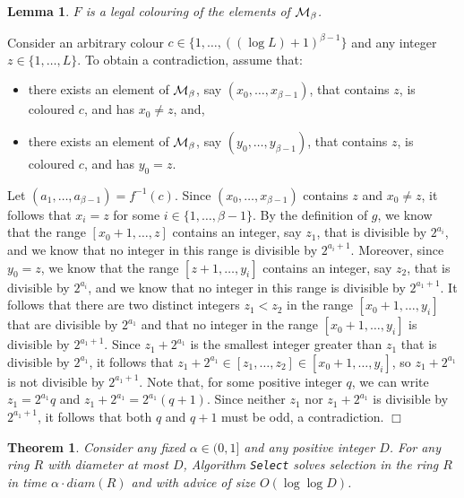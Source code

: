 \documentclass[11pt]{article}
\newtheorem{theorem}{Theorem}[section]
\newtheorem{lemma}{Lemma}[section]
\newcommand{\qed}{\hfill $\Box$ \bigbreak}
\newenvironment{proof}{\noindent {\bf Proof.}}{\qed}
\newcommand{\diam}[1]{\ensuremath{{diam}(#1)}}
\newcommand{\maxcandidates}{\ensuremath{\beta}}
\begin{document}
\begin{lemma}\label{isLegal}
$F$ is a legal colouring of the elements of ${\cal M}_{\maxcandidates}$.
\end{lemma}
\begin{proof}
Consider an arbitrary colour $c \in \{1,\dots, ((\log L)+1)^{\maxcandidates-1}\}$ and any integer $z \in \{1,\ldots,L\}$. To obtain a contradiction, assume that: 
\begin{itemize}
\item there exists an element of ${\cal M}_{\maxcandidates}$, say $(x_0,\ldots,x_{\maxcandidates-1})$, that contains $z$, is coloured $c$, and has $x_0 \neq z$, and,
\item there exists an element of ${\cal M}_{\maxcandidates}$, say $(y_0,\ldots,y_{\maxcandidates-1})$, that contains $z$, is coloured $c$, and has $y_0 = z$.
\end{itemize}
Let $(a_1,\ldots,a_{\maxcandidates-1})=f^{-1}(c)$.
Since $(x_0,\ldots,x_{\maxcandidates-1})$ contains $z$ and $x_0 \neq z$, it follows that $x_i = z$ for some $i \in \{1,\ldots,\maxcandidates-1\}$. By the definition of $g$, we know that the range $[x_0+1,\ldots,z]$ contains an integer, say $z_1$, that is divisible by $2^{a_i}$, and we know that no integer in this range is divisible by $2^{a_i+1}$. Moreover, since $y_0 = z$, we know that the range $[z+1,\ldots,y_i]$ contains an integer, say $z_2$, that is divisible by $2^{a_i}$, and we know that no integer in this range is divisible by $2^{a_1+1}$. It follows that there are two distinct integers $z_1 < z_2$ in the range $[x_0+1,\ldots,y_i]$ that are divisible by $2^{a_1}$ and that no integer in the range $[x_0+1,\ldots,y_i]$ is divisible by $2^{a_1+1}$. Since $z_1+2^{a_1}$ is the smallest integer greater than $z_1$ that is divisible by $2^{a_1}$, it follows that $z_1+2^{a_1} \in [z_1,\ldots,z_2] \in [x_0+1,\ldots,y_i]$, so $z_1+2^{a_1}$ is not divisible by $2^{a_1+1}$. Note that, for some positive integer $q$, we can write $z_1 = 2^{a_1}q$ and $z_1 + 2^{a_1} = 2^{a_1}(q+1)$. Since neither $z_1$ nor $z_1 + 2^{a_1}$ is divisible by $2^{a_1+1}$, it follows that both $q$ and $q+1$ must be odd, a contradiction.
\end{proof}


\begin{theorem}\label{ub}
Consider any fixed $\alpha \in (0,1]$ and any positive integer $D$. For any ring $R$ with diameter at most $D$,
Algorithm {\tt Select} solves selection in the ring $R$ 
in time $\alpha\cdot\diam{R}$ and with advice of size $O(\log\log D)$.
\end{theorem}
\end{document}

